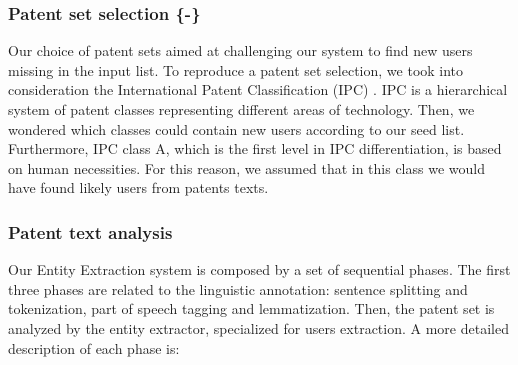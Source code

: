 \documentclass[b5paper,]{book}
\theoremstyle{definition}
\theoremstyle{definition}
\theoremstyle{definition}
\theoremstyle{remark}
\begin{document}
\subsubsection{Patent set selection \{-\}}\label{patsetsel}

Our choice of patent sets aimed at challenging our system to find new
users missing in the input list. To reproduce a patent set selection, we
took into consideration the International Patent Classification (IPC)
\citep{wipo1}. IPC is a hierarchical system of patent classes
representing different areas of technology. Then, we wondered which
classes could contain new users according to our seed list. Furthermore,
IPC class A, which is the first level in IPC differentiation, is based
on human necessities. For this reason, we assumed that in this class we
would have found likely users from patents texts.

\subsubsection*{Patent text analysis}\label{patent-text-analysis}

Our Entity Extraction system is composed by a set of sequential phases.
The first three phases are related to the linguistic annotation:
sentence splitting and tokenization, part of speech tagging and
lemmatization. Then, the patent set is analyzed by the entity extractor,
specialized for users extraction. A more detailed description of each
phase is:
\end{document}
